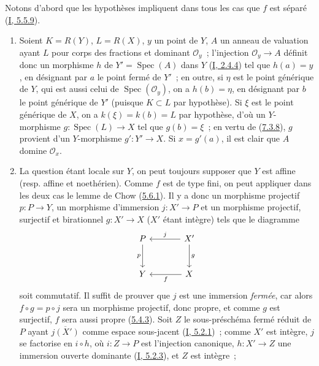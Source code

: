 Notons d'abord que les hypothèses impliquent dans tous les cas que $f$ est
séparé (\hyperref[I.5.5.9-fr]{I, 5.5.9}).
\begin{enumerate}
\item[\rm (i)] Soient $K=R(Y)$, $L=R(X)$, $y$ un point de $Y$, $A$ un anneau
de valuation ayant $L$ pour corps des fractions et dominant
$\mathcal{O}_y$~; l'injection $\mathcal{O}_y\to A$ définit donc un morphisme
$h$ de $Y'=\operatorname{Spec}(A)$ dans $Y$
(\hyperref[I.2.4.4-fr]{I, 2.4.4}) tel que $h(a)=y$, en désignant par $a$ le
point fermé de $Y'$~; en outre, si $\eta$ est le point générique de $Y$, qui
est aussi celui de $\operatorname{Spec}(\mathcal{O}_y)$, on a $h(b)=\eta$, en
désignant par $b$ le point générique de $Y'$ (puisque $K\subset L$ par
hypothèse). Si $\xi$ est le point générique de $X$, on a $k(\xi)=k(b)=L$ par
hypothèse, d'où un $Y$-morphisme $g:\operatorname{Spec}(L)\to X$ tel que
$g(b)=\xi$~; en vertu de (\hyperref[II.7.3.8-fr]{7.3.8}), $g$ provient d'un
$Y$-morphisme $g':Y'\to X$. Si $x=g'(a)$, il est clair que $A$ domine
$\mathcal{O}_x$.
\item[\rm (ii)] La question étant locale sur $Y$, on peut toujours supposer
que $Y$ est affine (resp. affine et noethérien). Comme $f$ est de type fini,
on peut appliquer dans les deux cas le lemme de Chow
(\hyperref[II.5.6.1-fr]{5.6.1}). Il y a donc un morphisme projectif
$p:P\to Y$, un morphisme d'immersion $j:X'\to P$ et un morphisme projectif,
surjectif et birationnel $g:X'\to X$ ($X'$ étant intègre) tels que le diagramme
\[
\begin{tikzcd}[column sep=large,row sep=large]
P \arrow[d,"p"'] & X' \arrow[l,"j"'] \arrow[d,"g"] \\
Y & X \arrow[l,"f"]
\end{tikzcd}
\]
soit commutatif. Il suffit de prouver que $j$ est une immersion \emph{fermée},
car alors $f\circ g=p\circ j$ sera un morphisme projectif, donc propre, et
comme $g$ est surjectif, $f$ sera aussi propre
(\hyperref[II.5.4.3-fr]{5.4.3}). Soit $Z$ le sous-préschéma fermé réduit de
$P$ ayant $\overline{j(X')}$ comme espace sous-jacent
(\hyperref[I.5.2.1-fr]{I, 5.2.1})~; comme $X'$ est intègre, $j$ se factorise
en $i\circ h$, où $i:Z\to P$ est l'injection canonique, $h:X'\to Z$ une
immersion ouverte dominante (\hyperref[I.5.2.3-fr]{I, 5.2.3}), et $Z$ est
intègre~;


\end{enumerate}
